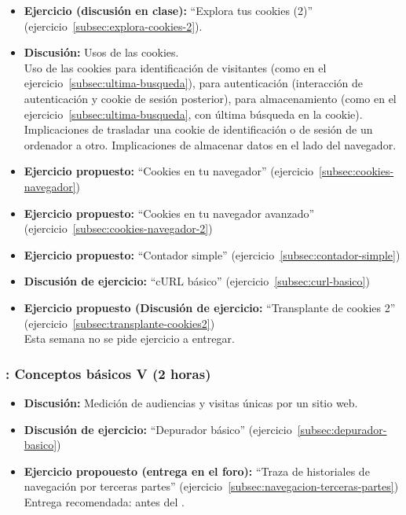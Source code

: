 \documentclass[a4paper,12pt]{article}
\begin{document}
\begin{itemize}
\item \textbf{Ejercicio (discusión en clase):} ``Explora tus cookies (2)'' (ejercicio~\ref{subsec:explora-cookies-2}).
\item \textbf{Discusión:} Usos de las cookies. \\
  Uso de las cookies para identificación de visitantes (como en el ejercicio~\ref{subsec:ultima-busqueda}), para autenticación (interacción de autenticación y cookie de sesión posterior), para almacenamiento (como en el ejercicio~\ref{subsec:ultima-busqueda}, con última búsqueda en la cookie). Implicaciones de trasladar una cookie de identificación o de sesión de un ordenador a otro. Implicaciones de almacenar datos en el lado del navegador.
\item \textbf{Ejercicio propuesto:} ``Cookies en tu navegador'' (ejercicio~\ref{subsec:cookies-navegador}) \\
\item \textbf{Ejercicio propuesto:} ``Cookies en tu navegador avanzado'' (ejercicio~\ref{subsec:cookies-navegador-2}) \\
\item \textbf{Ejercicio propuesto:} ``Contador simple'' (ejercicio~\ref{subsec:contador-simple})
\item \textbf{Discusión de ejercicio:} ``cURL básico'' (ejercicio~\ref{subsec:curl-basico})
\item \textbf{Ejercicio propuesto (Discusión de ejercicio:} ``Transplante de cookies 2'' (ejercicio~\ref{subsec:transplante-cookies2}) \\
Esta semana no se pide ejercicio a entregar.
\end{itemize}

\subsubsection{\martesF: Conceptos básicos V (2 horas)}
\label{cal:martesF}

\begin{itemize}
\item \textbf{Discusión:} Medición de audiencias y visitas únicas por un sitio web.
\item \textbf{Discusión de ejercicio:} ``Depurador básico'' (ejercicio~\ref{subsec:depurador-basico})
\item \textbf{Ejercicio propouesto (entrega en el foro):} ``Traza de historiales de navegación por terceras partes'' (ejercicio~\ref{subsec:navegacion-terceras-partes}) \\
  Entrega recomendada: antes del \martesG.
\end{itemize}
\end{document}
